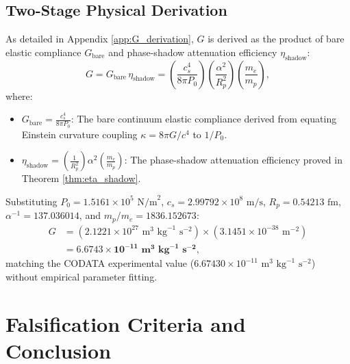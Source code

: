 \documentclass[11pt,a4paper]{article}
\begin{document}
	\subsection{Two-Stage Physical Derivation}
	As detailed in Appendix \ref{app:G_derivation}, $G$ is derived as the product of bare elastic compliance $G_{\text{bare}}$ and phase-shadow attenuation efficiency $\eta_{\text{shadow}}$:
	\begin{equation}
		G = G_{\text{bare}} \, \eta_{\text{shadow}} = \left( \frac{c_s^4}{8\pi P_0} \right) \left( \frac{\alpha^2}{R_p^2} \right) \left( \frac{m_e}{m_p} \right),
		\label{eq:G_master_formula}
	\end{equation}
	where:
	\begin{itemize}
		\item $G_{\text{bare}} = \frac{c_s^4}{8\pi P_0}$: The bare continuum elastic compliance derived from equating Einstein curvature coupling $\kappa = 8\pi G / c^4$ to $1/P_0$.
		\item $\eta_{\text{shadow}} = \left(\frac{1}{R_p^2}\right) \alpha^2 \left(\frac{m_e}{m_p}\right)$: The phase-shadow attenuation efficiency proved in Theorem \ref{thm:eta_shadow}.
	\end{itemize}
	
	Substituting $P_0 = 1.5161 \times 10^5 \text{ N/m}^2$, $c_s = 2.99792 \times 10^8 \text{ m/s}$, $R_p = 0.54213 \text{ fm}$, $\alpha^{-1} = 137.036014$, and $m_p / m_e = 1836.152673$:
	\begin{align}
		G &= \left( 2.1221 \times 10^{27} \text{ m}^3\text{ kg}^{-1}\text{ s}^{-2} \right) \times \left( 3.1451 \times 10^{-38} \text{ m}^{-2} \right) \nonumber \\
		&= \mathbf{6.6743 \times 10^{-11} \text{ m}^3\text{ kg}^{-1}\text{ s}^{-2}},
		\label{eq:G_numerical_main_text}
	\end{align}
	matching the CODATA experimental value ($6.67430 \times 10^{-11} \text{ m}^3\text{ kg}^{-1}\text{ s}^{-2}$) without empirical parameter fitting.
	
	\section{Falsification Criteria and Conclusion}
	\label{sec:falsification}
	
\end{document}
